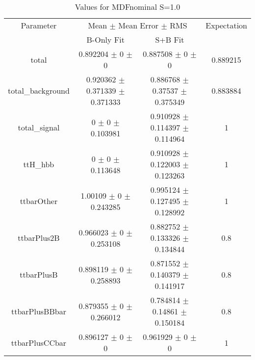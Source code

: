 \begin{table}
\centering
\caption{Values for MDFnominal S=1.0}
\begin{tabular}{cccc}
\toprule
Parameter & \multicolumn{2}{c}{Mean $\pm$ Mean Error $\pm$ RMS} & Expectation\\
 & B-Only Fit & S+B Fit & \\
\midrule
total & \num{0.892204} $\pm$ \num{0} $\pm$ \num{0} & \num{0.887508} $\pm$ \num{0} $\pm$ \num{0} & \num{0.889215}\\
total\_background & \num{0.920362} $\pm$ \num{0.371339} $\pm$ \num{0.371333} & \num{0.886768} $\pm$ \num{0.37537} $\pm$ \num{0.375349} & \num{0.883884}\\
total\_signal & \num{0} $\pm$ \num{0} $\pm$ \num{0.103981} & \num{0.910928} $\pm$ \num{0.114397} $\pm$ \num{0.114964} & \num{1}\\
ttH\_hbb & \num{0} $\pm$ \num{0} $\pm$ \num{0.113648} & \num{0.910928} $\pm$ \num{0.122003} $\pm$ \num{0.123263} & \num{1}\\
ttbarOther & \num{1.00109} $\pm$ \num{0} $\pm$ \num{0.243285} & \num{0.995124} $\pm$ \num{0.127495} $\pm$ \num{0.128992} & \num{1}\\
ttbarPlus2B & \num{0.966023} $\pm$ \num{0} $\pm$ \num{0.253108} & \num{0.882752} $\pm$ \num{0.133326} $\pm$ \num{0.134844} & \num{0.8}\\
ttbarPlusB & \num{0.898119} $\pm$ \num{0} $\pm$ \num{0.258893} & \num{0.871552} $\pm$ \num{0.140379} $\pm$ \num{0.141917} & \num{0.8}\\
ttbarPlusBBbar & \num{0.879355} $\pm$ \num{0} $\pm$ \num{0.266012} & \num{0.784814} $\pm$ \num{0.14861} $\pm$ \num{0.150184} & \num{0.8}\\
ttbarPlusCCbar & \num{0.896127} $\pm$ \num{0} $\pm$ \num{0} & \num{0.961929} $\pm$ \num{0} $\pm$ \num{0} & \num{1}\\
\bottomrule
\end{tabular}
\end{table}